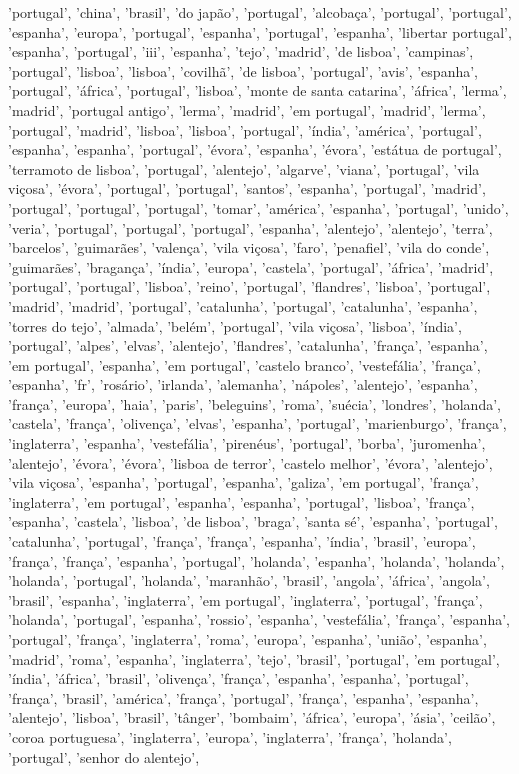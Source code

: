 \documentclass{article}
\begin{document}
\begin{itemize}
'portugal', 'china', 'brasil', 'do japão', 'portugal', 'alcobaça', 'portugal', 'portugal', 'espanha', 'europa', 'portugal', 'espanha', 'portugal', 'espanha', 'libertar portugal', 'espanha', 'portugal', 'iii', 'espanha', 'tejo', 'madrid', 'de lisboa', 'campinas', 'portugal', 'lisboa', 'lisboa', 'covilhã', 'de lisboa', 'portugal', 'avis', 'espanha', 'portugal', 'áfrica', 'portugal', 'lisboa', 'monte de santa catarina', 'áfrica', 'lerma', 'madrid', 'portugal antigo', 'lerma', 'madrid', 'em portugal', 'madrid', 'lerma', 'portugal', 'madrid', 'lisboa', 'lisboa', 'portugal', 'índia', 'américa', 'portugal', 'espanha', 'espanha', 'portugal', 'évora', 'espanha', 'évora', 'estátua de portugal', 'terramoto de lisboa', 'portugal', 'alentejo', 'algarve', 'viana', 'portugal', 'vila viçosa', 'évora', 'portugal', 'portugal', 'santos', 'espanha', 'portugal', 'madrid', 'portugal', 'portugal', 'portugal', 'tomar', 'américa', 'espanha', 'portugal', 'unido', 'veria', 'portugal', 'portugal', 'portugal', 'espanha', 'alentejo', 'alentejo', 'terra', 'barcelos', 'guimarães', 'valença', 'vila viçosa', 'faro', 'penafiel', 'vila do conde', 'guimarães', 'bragança', 'índia', 'europa', 'castela', 'portugal', 'áfrica', 'madrid', 'portugal', 'portugal', 'lisboa', 'reino', 'portugal', 'flandres', 'lisboa', 'portugal', 'madrid', 'madrid', 'portugal', 'catalunha', 'portugal', 'catalunha', 'espanha', 'torres do tejo', 'almada', 'belém', 'portugal', 'vila viçosa', 'lisboa', 'índia', 'portugal', 'alpes', 'elvas', 'alentejo', 'flandres', 'catalunha', 'frança', 'espanha', 'em portugal', 'espanha', 'em portugal', 'castelo branco', 'vestefália', 'frança', 'espanha', 'fr', 'rosário', 'irlanda', 'alemanha', 'nápoles', 'alentejo', 'espanha', 'frança', 'europa', 'haia', 'paris', 'beleguins', 'roma', 'suécia', 'londres', 'holanda', 'castela', 'frança', 'olivença', 'elvas', 'espanha', 'portugal', 'marienburgo', 'frança', 'inglaterra', 'espanha', 'vestefália', 'pirenéus', 'portugal', 'borba', 'juromenha', 'alentejo', 'évora', 'évora', 'lisboa de terror', 'castelo melhor', 'évora', 'alentejo', 'vila viçosa', 'espanha', 'portugal', 'espanha', 'galiza', 'em portugal', 'frança', 'inglaterra', 'em portugal', 'espanha', 'espanha', 'portugal', 'lisboa', 'frança', 'espanha', 'castela', 'lisboa', 'de lisboa', 'braga', 'santa sé', 'espanha', 'portugal', 'catalunha', 'portugal', 'frança', 'frança', 'espanha', 'índia', 'brasil', 'europa', 'frança', 'frança', 'espanha', 'portugal', 'holanda', 'espanha', 'holanda', 'holanda', 'holanda', 'portugal', 'holanda', 'maranhão', 'brasil', 'angola', 'áfrica', 'angola', 'brasil', 'espanha', 'inglaterra', 'em portugal', 'inglaterra', 'portugal', 'frança', 'holanda', 'portugal', 'espanha', 'rossio', 'espanha', 'vestefália', 'frança', 'espanha', 'portugal', 'frança', 'inglaterra', 'roma', 'europa', 'espanha', 'união', 'espanha', 'madrid', 'roma', 'espanha', 'inglaterra', 'tejo', 'brasil', 'portugal', 'em portugal', 'índia', 'áfrica', 'brasil', 'olivença', 'frança', 'espanha', 'espanha', 'portugal', 'frança', 'brasil', 'américa', 'frança', 'portugal', 'frança', 'espanha', 'espanha', 'alentejo', 'lisboa', 'brasil', 'tânger', 'bombaim', 'áfrica', 'europa', 'ásia', 'ceilão', 'coroa portuguesa', 'inglaterra', 'europa', 'inglaterra', 'frança', 'holanda', 'portugal', 'senhor do alentejo', 
\end{itemize}
\end{document}
